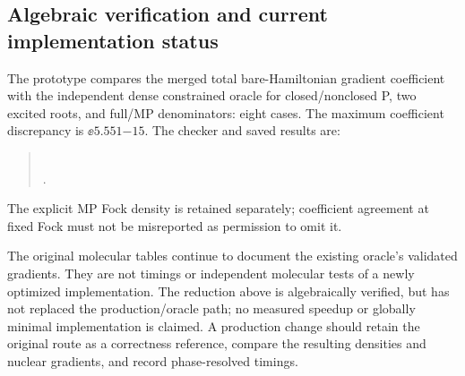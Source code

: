 \subsection{Algebraic verification and current implementation status}
\label{sec:leanvalidation}
The prototype compares the merged total bare-Hamiltonian gradient
coefficient with the independent
dense constrained oracle for closed/nonclosed P, two excited roots, and
full/MP denominators: eight cases. The maximum coefficient discrepancy is
$\ee{5.551}{-15}$. The checker and saved results are:
\begin{quote}\small
{}\\
.
\end{quote}
The explicit MP Fock density is retained separately; coefficient agreement
at fixed Fock must not be misreported as permission to omit it.

The original molecular tables continue to document the existing oracle's
validated gradients. They are not timings or independent molecular tests
of a newly optimized implementation. The reduction above is algebraically
verified, but has not replaced the production/oracle path; no measured
speedup or globally minimal implementation is claimed. A production change
should retain the original route as a correctness reference, compare the
resulting densities and nuclear gradients, and record phase-resolved timings.
